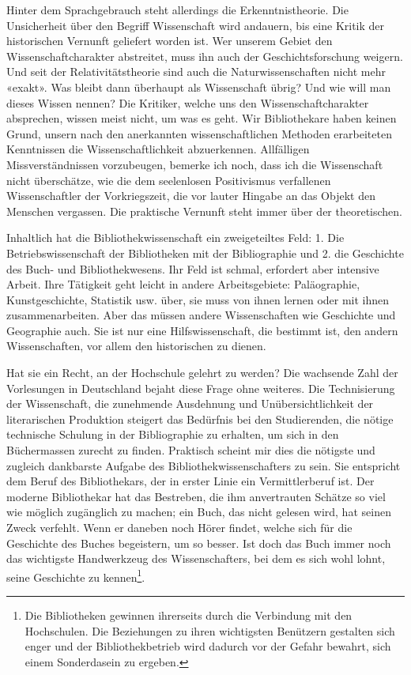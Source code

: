 \documentclass[a4paper,
fontsize=11pt,
oneside,
numbers=noperiodatend,
parskip=half-,
bibliography=totoc,
final
]{scrartcl}
\begin{document}
Hinter dem Sprachgebrauch steht allerdings die Erkenntnistheorie. Die
Unsicherheit über den Begriff Wissenschaft wird andauern, bis eine
Kritik der historischen Vernunft geliefert worden ist. Wer unserem
Gebiet den Wissenschaftcharakter abstreitet, muss ihn auch der
Geschichtsforschung weigern. Und seit der Relativitätstheorie sind auch
die Naturwissenschaften nicht mehr «exakt». Was bleibt dann überhaupt
als Wissenschaft übrig? Und wie will man dieses Wissen nennen? Die
Kritiker, welche uns den Wissenschaftcharakter absprechen, wissen meist
nicht, um was es geht. Wir Bibliothekare haben keinen Grund, unsern nach
den anerkannten wissenschaftlichen Methoden erarbeiteten Kenntnissen die
Wissenschaftlichkeit abzuerkennen. Allfälligen Missverständnissen
vorzubeugen, bemerke ich noch, dass ich die Wissenschaft nicht
überschätze, wie die dem seelenlosen Positivismus verfallenen
Wissenschaftler der Vorkriegszeit, die vor lauter Hingabe an das Objekt
den Menschen vergassen. Die praktische Vernunft steht immer über der
theoretischen.

Inhaltlich hat die Bibliothekwissenschaft ein zweigeteiltes Feld: 1. Die
Betriebswissenschaft der Bibliotheken mit der Bibliographie und 2. die
Geschichte des Buch- und Bibliothekwesens. Ihr Feld ist schmal,
erfordert aber intensive Arbeit. Ihre Tätigkeit geht leicht in andere
Arbeitsgebiete: Paläographie, Kunstgeschichte, Statistik usw. über, sie
muss von ihnen lernen oder mit ihnen zusammenarbeiten. Aber das müssen
andere Wissenschaften wie Geschichte und Geographie auch. Sie ist nur
eine Hilfswissenschaft, die bestimmt ist, den andern Wissenschaften, vor
allem den historischen zu dienen.

Hat sie ein Recht, an der Hochschule gelehrt zu werden? Die wachsende
Zahl der Vorlesungen in Deutschland bejaht diese Frage ohne weiteres.
Die Technisierung der Wissenschaft, die zunehmende Ausdehnung und
Unübersichtlichkeit der literarischen Produktion steigert das Bedürfnis
bei den Studierenden, die nötige technische Schulung in der
Bibliographie zu erhalten, um sich in den Büchermassen zurecht zu
finden. Praktisch scheint mir dies die nötigste und zugleich dankbarste
Aufgabe des Bibliothekwissenschafters zu sein. Sie entspricht dem Beruf
des Bibliothekars, der in erster Linie ein Vermittlerberuf ist. Der
moderne Bibliothekar hat das Bestreben, die ihm anvertrauten Schätze so
viel wie möglich zugänglich zu machen; ein Buch, das nicht gelesen wird,
hat seinen Zweck verfehlt. Wenn er daneben noch Hörer findet, welche
sich für die Geschichte des Buches begeistern, um so besser. Ist doch
das Buch immer noch das wichtigste Handwerkzeug des Wissenschafters, bei
dem es sich wohl lohnt, seine Geschichte zu kennen\footnote{Die
  Bibliotheken gewinnen ihrerseits durch die Verbindung mit den
  Hochschulen. Die Beziehungen zu ihren wichtigsten Benützern gestalten
  sich enger und der Bibliothekbetrieb wird dadurch vor der Gefahr
  bewahrt, sich einem Sonderdasein zu ergeben.}.
\end{document}
